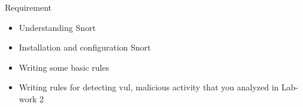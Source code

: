 \begin{frame}[t]{Requirement}
  \fontsize{17}{20.5}\selectfont
  \vspace{0.2cm}
  \begin{itemize}
    \item Understanding Snort
    \item Installation and configuration Snort
    \item Writing some basic rules
    \item Writing rules for detecting vul, malicious activity that you analyzed in Lab-work 2
  \end{itemize}
\end{frame}
